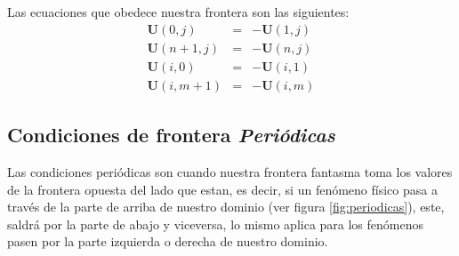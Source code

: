 \documentclass[12pt,a4paper]{book}
\begin{document}
Las ecuaciones que obedece nuestra frontera son las siguientes:
\begin{eqnarray}
\textbf{U}(0,j)&=&-\textbf{U}(1,j) \\
\textbf{U}(n+1,j)&=&-\textbf{U}(n,j) \\
\textbf{U}(i,0)&=&-\textbf{U}(i,1) \\
\textbf{U}(i,m+1)&=&-\textbf{U}(i,m) 
\end{eqnarray}


\subsection{Condiciones de frontera \emph{Periódicas}}
Las condiciones periódicas son cuando nuestra frontera fantasma toma los valores de la frontera opuesta del lado que estan, es decir, si un fenómeno físico pasa a través de la parte de arriba de nuestro dominio (ver figura \ref{fig:periodicas}), este, saldrá por la parte de abajo y viceversa, lo mismo aplica para los fenómenos pasen por la parte izquierda o derecha de nuestro dominio.
 
\end{document}

